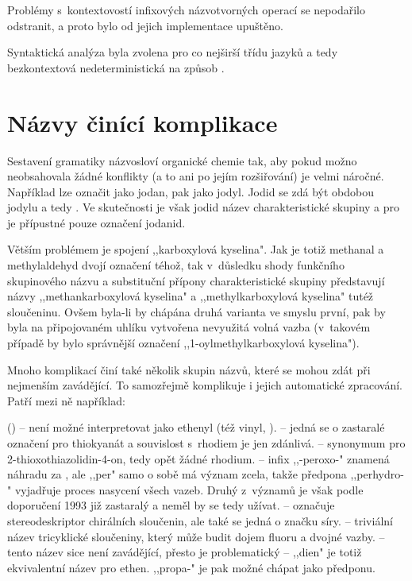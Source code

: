 Problémy s~kontextovostí infixových názvotvorných operací se nepodařilo
odstranit, a proto bylo od jejich implementace upuštěno.

Syntaktická analýza byla zvolena pro co nejširší třídu jazyků a tedy
bezkontextová nedeterministická na způsob .

\section{Názvy činící komplikace}
Sestavení gramatiky názvosloví organické chemie tak, aby pokud možno
ne\-ob\-sa\-ho\-va\-la žádné konflikty (a to ani po jejím rozšiřování) je velmi náročné.
Například  lze označit jako jodan,  pak jako jodyl. Jodid se
zdá být obdobou jodylu a tedy . Ve skutečnosti je však jodid název
charakteristické skupiny  a pro  je přípustné pouze označení
jodanid.

Větším problémem je spojení ,,karboxylová kyselina". Jak je totiž me\-tha\-n\-al a
methylaldehyd dvojí označení téhož, tak v~důsledku shody funkčního skupinového
názvu a substituční přípony charakteristické skupiny před\-sta\-vu\-jí názvy
,,methankarboxylová kyselina" a ,,methylkarboxylová kyselina" tutéž sloučeninu.
Ovšem byla-li by chápána druhá varianta ve smyslu první, pak by byla na
připojovaném uhlíku vytvořena nevyužitá volná vazba (v~ta\-ko\-vém případě by bylo
správnější označení ,,1-oylmethylkarboxylová kyselina").

Mnoho komplikací činí také několik skupin názvů, které se mohou zdát při
nejmenším zavádějící. To samozřejmě komplikuje i jejich automatické zpracování.
Patří mezi ně například:
\begin{itemize}
	 () -- není možné interpretovat jako
					  ethenyl (též vinyl, ).
	 -- jedná se o zastaralé označení pro thiokyanát a souvislost
					   s~rhodiem je jen zdánlivá.
	 -- synonymum pro 2-thioxothiazolidin-4-on, tedy opět
					   žádné rhodium.
	 -- infix ,,-peroxo-" znamená náhradu  za ,
				 ale ,,per" samo o sobě má význam zcela, takže předpona
				 ,,perhydro-" vyjadřuje proces nasycení všech vazeb. Druhý
				 z~významů je však podle do\-po\-ru\-če\-ní 1993 již zastaralý a neměl
				 by se tedy užívat.
	 -- označuje stereodeskriptor chirálních sloučenin, ale také se
				jedná o značku síry.
	 -- triviální název tricyklické sloučeniny, který může budit
					  dojem fluoru a dvojné vazby.
	 -- tento název sice není zavádějící, přesto je problematický
					 -- ,,dien" je totiž ekvivalentní název pro ethen. ,,propa-"
					 je pak možné chápat jako předponu.
\end{itemize}


